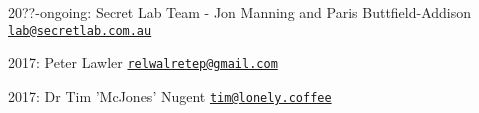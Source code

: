 
\begin{DoxyItemize}
\item 20??-\/ongoing\-: Secret Lab Team -\/ Jon Manning and Paris Buttfield-\/\-Addison \href{mailto:lab@secretlab.com.au}{\tt lab@secretlab.\-com.\-au}
\item 2017\-: Peter Lawler \href{mailto:relwalretep@gmail.com}{\tt relwalretep@gmail.\-com}
\item 2017\-: Dr Tim 'Mc\-Jones' Nugent \href{mailto:tim@lonely.coffee}{\tt tim@lonely.\-coffee} 
\end{DoxyItemize}